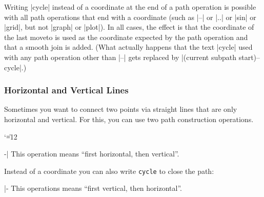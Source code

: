 Writing |cycle| instead of a coordinate at the end of a path operation is
possible with all path operations that end with a coordinate (such as |--| or
|..| or |sin| or |grid|, but not |graph| or |plot|). In all cases, the effect
is that the coordinate of the last moveto is used as the coordinate expected by
the path operation and that a smooth join is added. (What actually happens that
the text |cycle| used with any path operation other than |--| gets replaced by
|(current subpath start)--cycle|.)


\subsubsection{Horizontal and Vertical Lines}

Sometimes you want to connect two points via straight lines that are only
horizontal and vertical. For this, you can use two path construction
operations.

{\catcode`\|=12
\begin{pathoperation}[noindex]{-|}{}
    \pgfmanualpdflabel[\catcode`\|=12 ]{-|}{}%
    This operation means ``first horizontal, then vertical''.
\begin{codeexample}[]
\end{codeexample}
    Instead of a coordinate you can also write \verb!cycle! to close the path:
\begin{codeexample}[]
\end{codeexample}
\end{pathoperation}

\begin{pathoperation}[noindex]{|-}{}
    \pgfmanualpdflabel[\catcode`\|=12 ]{|-}{}%
    This operations means ``first vertical, then horizontal''.
\end{pathoperation}
}


